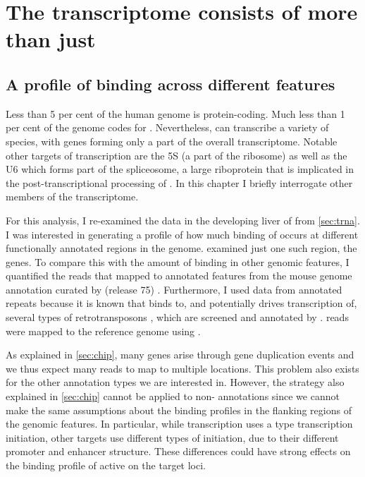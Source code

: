 \chapter{The  transcriptome consists of more than just }
\label{sec:pol3}

\section{A profile of  binding across different features}

Less than \num{5} per cent of the human genome is protein-coding. Much less than
\num{1} per cent of the genome codes for \trna[s] \citep{Lander:2001}.
Nevertheless,  can transcribe a variety of \rna species, with \trna genes
forming only a part of the overall  transcriptome. Notable other targets of
 transcription are the 5S \rrna (a part of the ribosome) as well as the U6
\rna which forms part of the spliceosome, a large riboprotein that is
implicated in the post-transcriptional processing of \rna[s] \citep{White:1998}.
In this chapter I briefly interrogate other members of the  transcriptome.

For this analysis, I re-examined the \chipseq data in the developing liver of
\mmu from \cref{sec:trna}. I was interested in generating a profile of how much
binding of  occurs at different functionally annotated regions in the
genome.  examined just one such region, the \trna genes. To
compare this with the amount of binding in other genomic features, I quantified
the \chipseq reads that mapped to annotated features from the 
mouse genome annotation curated by  (release \num{75})
\citep{Flicek:2014}. Furthermore, I used data from annotated repeats because it
is known that  binds to, and potentially drives transcription of, several
types of retrotransposons \citep{Carriere:2012}, which are screened and
annotated by  \citep{Smit:2014}.  \chipseq reads
were mapped to the \mmu reference genome  using 
\citep{Langmead:2009}.

As explained in \cref{sec:chip}, many \trna genes arise through gene duplication
events and we thus expect many reads to map to multiple locations. This problem
also exists for the other annotation types we are interested in. However, the
strategy also explained in \cref{sec:chip} cannot be applied to non-\trna
annotations since we cannot make the same assumptions about the binding profiles
in the flanking regions of the genomic features. In particular, while \trna
transcription uses a type  transcription initiation, other 
targets use different types of initiation, due to their different promoter and
enhancer structure. These differences could have strong effects on the binding
profile of active  on the target loci.

